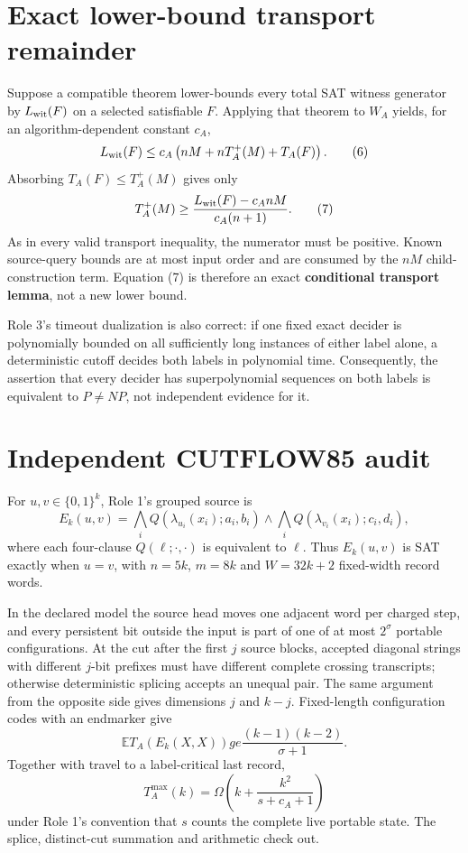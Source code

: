 \documentclass[11pt]{article}
\begin{document}
\section{Exact lower-bound transport remainder}
Suppose a compatible theorem lower-bounds every total SAT witness generator
by $L_{\rm wit}(F)$ on a selected satisfiable $F$.  Applying that theorem to
$W_A$ yields, for an algorithm-dependent constant $c_A$,
\[
L_{\rm wit}(F)
\le c_A\left(nM+nT_A^+(M)+T_A(F)\right).
\tag{6}
\]
Absorbing $T_A(F)\le T_A^+(M)$ gives only
\[
T_A^+(M)\ge
\frac{L_{\rm wit}(F)-c_A nM}{c_A(n+1)}.
\tag{7}
\]
As in every valid transport inequality, the numerator must be positive.
Known source-query bounds are at most input order and are consumed by the
$nM$ child-construction term.  Equation (7) is therefore an exact
\textbf{conditional transport lemma}, not a new lower bound.

Role 3's timeout dualization is also correct: if one fixed exact decider is
polynomially bounded on all sufficiently long instances of either label
alone, a deterministic cutoff decides both labels in polynomial time.
Consequently, the assertion that every decider has superpolynomial sequences
on both labels is equivalent to $P\ne NP$, not independent evidence for it.

\section{Independent CUTFLOW85 audit}
For $u,v\in\{0,1\}^k$, Role 1's grouped source is
\[
E_k(u,v)=\bigwedge_iQ(\lambda_{u_i}(x_i);a_i,b_i)
\wedge\bigwedge_iQ(\lambda_{v_i}(x_i);c_i,d_i),
\tag{8}
\]
where each four-clause $Q(\ell;\cdot,\cdot)$ is equivalent to $\ell$.
Thus $E_k(u,v)$ is SAT exactly when $u=v$, with $n=5k$, $m=8k$ and
$W=32k+2$ fixed-width record words.

In the declared model the source head moves one adjacent word per charged
step, and every persistent bit outside the input is part of one of at most
$2^\sigma$ portable configurations.  At the cut after the first $j$ source
blocks, accepted diagonal strings with different $j$-bit prefixes must have
different complete crossing transcripts; otherwise deterministic splicing
accepts an unequal pair.  The same argument from the opposite side gives
dimensions $j$ and $k-j$.  Fixed-length configuration codes with an endmarker
give
\[
\mathbb E T_A(E_k(X,X))ge
\frac{(k-1)(k-2)}{\sigma+1}.
\tag{9}
\]
Together with travel to a label-critical last record,
\[
T_A^{\max}(k)=\Omega\!\left(k+\frac{k^2}{s+c_A+1}\right)
\tag{10}
\]
under Role 1's convention that $s$ counts the complete live portable state.
The splice, distinct-cut summation and arithmetic check out.
\end{document}
